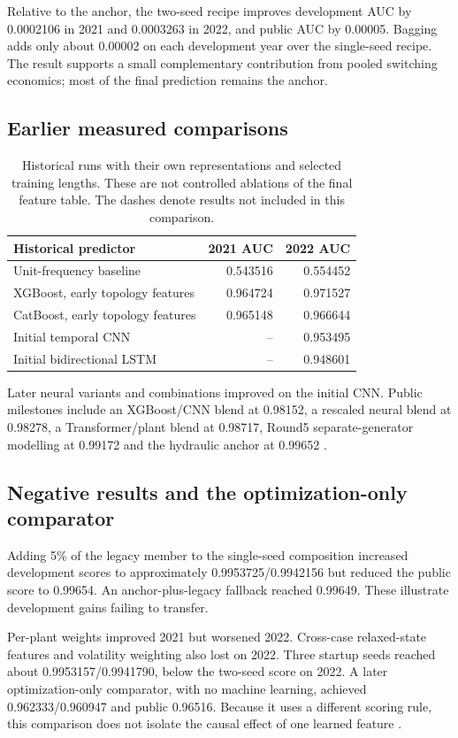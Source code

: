 \documentclass[a4paper,11pt]{article}
\begin{document}
Relative to the anchor, the two-seed recipe improves development AUC by 0.0002106 in 2021 and 0.0003263 in 2022, and public AUC by 0.00005. Bagging adds only about 0.00002 on each development year over the single-seed recipe. The result supports a small complementary contribution from pooled switching economics; most of the final prediction remains the anchor.

\subsection*{Earlier measured comparisons}
\begin{table}[ht]
\centering
\begin{tabular}{lrr}
\hline
Historical predictor & 2021 AUC & 2022 AUC\\\hline
Unit-frequency baseline & 0.543516 & 0.554452\\
XGBoost, early topology features & 0.964724 & 0.971527\\
CatBoost, early topology features & 0.965148 & 0.966644\\
Initial temporal CNN & -- & 0.953495\\
Initial bidirectional LSTM & -- & 0.948601\\\hline
\end{tabular}
\caption{Historical runs with their own representations and selected training lengths. These are not controlled ablations of the final feature table. The dashes denote results not included in this comparison.}
\end{table}

Later neural variants and combinations improved on the initial CNN. Public milestones include an XGBoost/CNN blend at 0.98152, a rescaled neural blend at 0.98278, a Transformer/plant blend at 0.98717, Round5 separate-generator modelling at 0.99172 and the hydraulic anchor at 0.99652 \cite{scores,history}.

\subsection*{Negative results and the optimization-only comparator}
Adding 5\% of the legacy member to the single-seed composition increased development scores to approximately 0.9953725/0.9942156 but reduced the public score to 0.99654. An anchor-plus-legacy fallback reached 0.99649. These illustrate development gains failing to transfer.

Per-plant weights improved 2021 but worsened 2022. Cross-case relaxed-state features and volatility weighting also lost on 2022. Three startup seeds reached about 0.9953157/0.9941790, below the two-seed score on 2022. A later optimization-only comparator, with no machine learning, achieved 0.962333/0.960947 and public 0.96516. Because it uses a different scoring rule, this comparison does not isolate the causal effect of one learned feature \cite{supplied}.
\end{document}
